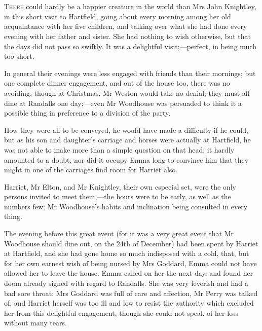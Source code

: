 \chapter[Chapter \thechapter]{}
\lettrine[lines=4,lraise=0.3]{T}{here} could hardly be a happier creature in the world than Mrs John Knightley, in this short visit to Hartfield, going about every morning among her old acquaintance with her five children, and talking over what she had done every evening with her father and sister. She had nothing to wish otherwise, but that the days did not pass so swiftly. It was a delightful visit;—perfect, in being much too short.

In general their evenings were less engaged with friends than their mornings; but one complete dinner engagement, and out of the house too, there was no avoiding, though at Christmas. Mr Weston would take no denial; they must all dine at Randalls one day;—even Mr Woodhouse was persuaded to think it a possible thing in preference to a division of the party.

How they were all to be conveyed, he would have made a difficulty if he could, but as his son and daughter's carriage and horses were actually at Hartfield, he was not able to make more than a simple question on that head; it hardly amounted to a doubt; nor did it occupy Emma long to convince him that they might in one of the carriages find room for Harriet also.

Harriet, Mr Elton, and Mr Knightley, their own especial set, were the only persons invited to meet them;—the hours were to be early, as well as the numbers few; Mr Woodhouse's habits and inclination being consulted in every thing.

The evening before this great event (for it was a very great event that Mr Woodhouse should dine out, on the 24th of December) had been spent by Harriet at Hartfield, and she had gone home so much indisposed with a cold, that, but for her own earnest wish of being nursed by Mrs Goddard, Emma could not have allowed her to leave the house. Emma called on her the next day, and found her doom already signed with regard to Randalls. She was very feverish and had a bad sore throat: Mrs Goddard was full of care and affection, Mr Perry was talked of, and Harriet herself was too ill and low to resist the authority which excluded her from this delightful engagement, though she could not speak of her loss without many tears.

